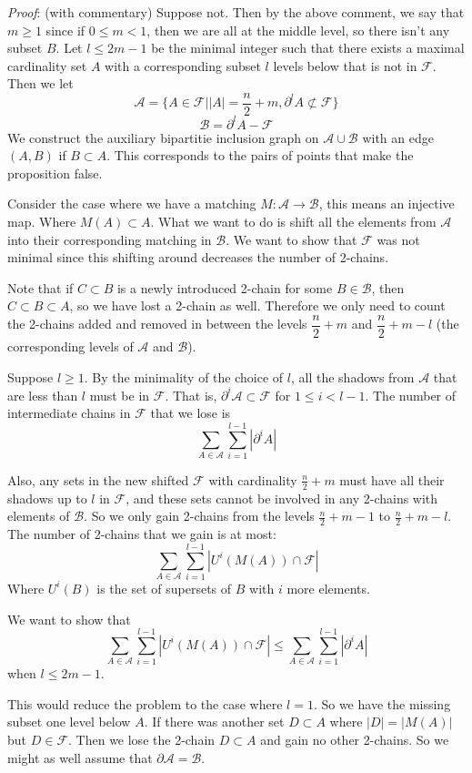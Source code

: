 \documentclass[11pt]{article}
\newcommand{\F}{\mathcal{F}}
\newcommand{\A}{\mathcal{A}}
\newcommand{\B}{\mathcal{B}}
\begin{document}
\textit{Proof}: (with commentary) Suppose not. Then by the above comment, we say that $m\geq 1$ since if $0\leq m<1$, then we are all at the middle level, so there isn't any subset $B$. Let $l \leq 2m - 1$ be the minimal integer such that there exists a maximal cardinality set $A$ with a corresponding subset $l$ levels below that is not in $\F$. Then we let 
\[ \A = \{ A \in \F | |A| = \dfrac{n}{2} + m, \partial^lA \not\subset \F \} \]
\[ \B = \partial^lA - \F \]
We construct the auxiliary bipartitie inclusion graph on $\A \cup \B$ with an edge $(A, B)$ if $B \subset A$. This corresponds to the pairs of points that make the proposition false. 

Consider the case where we have a matching $M: \A \rightarrow \B$, this means an injective map. Where $M(A) \subset A$. What we want to do is shift all the elements from $\A$ into their corresponding matching in $\B$. We want to show that $\F$ was not minimal since this shifting around decreases the number of 2-chains. 

Note that if $C \subset B$ is a newly introduced 2-chain for some $B \in \B$, then $C \subset B \subset A$, so we have lost a 2-chain as well. Therefore we only need to count the 2-chains added and removed in between the levels $\dfrac{n}{2} + m$ and $\dfrac{n}{2} + m - l$ (the corresponding levels of $\A$ and $\B$). 

Suppose $l \geq 1$. By the minimality of the choice of $l$, all the shadows from $\A$ that are less than $l$ must be in $\F$. That is, $\partial^i\A \subset \F$ for $1 \leq i < l-1$. The number of intermediate chains in $\F$ that we lose is
\[ \sum_{A \in \A} \sum_{i=1}^{l-1} |\partial^i A| \]

Also, any sets in the new shifted $\F$ with cardinality $\frac{n}{2} + m$ must have all their shadows up to $l$ in $\F$, and these sets cannot be involved in any 2-chains with elements of $\B$. So we only gain 2-chains from the levels $\frac{n}{2}+m-1$ to $\frac{n}{2}+m-l$. The number of 2-chains that we gain is at most:
\[ \sum_{A \in \A} \sum_{i=1}^{l-1} |U^i(M(A)) \cap \F| \]
Where $U^i(B)$ is the set of supersets of $B$ with $i$ more elements.

We want to show that \[ \sum_{A \in \A} \sum_{i=1}^{l-1} |U^i(M(A)) \cap \F| \leq  \sum_{A \in \A} \sum_{i=1}^{l-1} |\partial^i A| \] when $l \leq 2m-1$.

This would reduce the problem to the case where $l=1$. So we have the missing subset one level below $A$. If there was another set $D \subset A$ where $|D| = |M(A)|$ but $D \in \F$. Then we lose the 2-chain $D \subset A$ and gain no other 2-chains. So we might as well assume that $\partial \A = \B$. 
\end{document}
